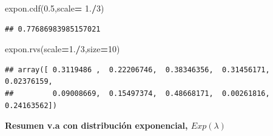 \documentclass[]{book}
\newenvironment{Shaded}{\begin{snugshade}}{\end{snugshade}}
\newcommand{\DecValTok}[1]{\textcolor[rgb]{0.00,0.00,0.81}{#1}}
\newcommand{\FloatTok}[1]{\textcolor[rgb]{0.00,0.00,0.81}{#1}}
\newcommand{\NormalTok}[1]{#1}
\newcommand{\OperatorTok}[1]{\textcolor[rgb]{0.81,0.36,0.00}{\textbf{#1}}}
\begin{document}
\begin{Shaded}
\begin{Highlighting}[]
\NormalTok{expon.cdf(}\FloatTok{0.5}\NormalTok{,scale}\OperatorTok{=} \FloatTok{1.}\OperatorTok{/}\DecValTok{3}\NormalTok{) }
\end{Highlighting}
\end{Shaded}

\begin{verbatim}
## 0.77686983985157021
\end{verbatim}

\begin{Shaded}
\begin{Highlighting}[]
\NormalTok{expon.rvs(scale}\OperatorTok{=}\FloatTok{1.}\OperatorTok{/}\DecValTok{3}\NormalTok{,size}\OperatorTok{=}\DecValTok{10}\NormalTok{)}
\end{Highlighting}
\end{Shaded}

\begin{verbatim}
## array([ 0.3119486 ,  0.22206746,  0.38346356,  0.31456171,  0.02376159,
##         0.09008669,  0.15497374,  0.48668171,  0.00261816,  0.24163562])
\end{verbatim}

\textbf{Resumen v.a con distribución exponencial, \(Exp(\lambda)\)}
\end{document}
